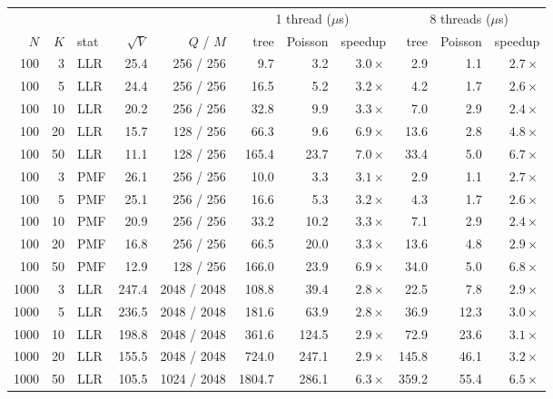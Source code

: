 \documentclass[11pt]{article}
\begin{document}
\begin{table}[tp]
\centering
\small
\begin{tabular}{rrlrrrrrrrr}
\toprule
 & & & & & \multicolumn{3}{c}{1 thread ($\mu$s)} & \multicolumn{3}{c}{8 threads ($\mu$s)} \\
\cmidrule(lr){6-8}\cmidrule(lr){9-11}
$N$ & $K$ & stat & $\sqrt V$ & $Q$ / $M$ & tree & Poisson & speedup & tree & Poisson & speedup \\
\midrule
100  & 3  & LLR & 25.4  & 256 / 256   & 9.7    & 3.2   & $3.0\times$ & 2.9    & 1.1   & $2.7\times$ \\
100  & 5  & LLR & 24.4  & 256 / 256   & 16.5   & 5.2   & $3.2\times$ & 4.2    & 1.7   & $2.6\times$ \\
100  & 10 & LLR & 20.2  & 256 / 256   & 32.8   & 9.9   & $3.3\times$ & 7.0    & 2.9   & $2.4\times$ \\
100  & 20 & LLR & 15.7  & 128 / 256   & 66.3   & 9.6   & $6.9\times$ & 13.6   & 2.8   & $4.8\times$ \\
100  & 50 & LLR & 11.1  & 128 / 256   & 165.4  & 23.7  & $7.0\times$ & 33.4   & 5.0   & $6.7\times$ \\
100  & 3  & PMF & 26.1  & 256 / 256   & 10.0   & 3.3   & $3.1\times$ & 2.9    & 1.1   & $2.7\times$ \\
100  & 5  & PMF & 25.1  & 256 / 256   & 16.6   & 5.3   & $3.2\times$ & 4.3    & 1.7   & $2.6\times$ \\
100  & 10 & PMF & 20.9  & 256 / 256   & 33.2   & 10.2  & $3.3\times$ & 7.1    & 2.9   & $2.4\times$ \\
100  & 20 & PMF & 16.8  & 256 / 256   & 66.5   & 20.0  & $3.3\times$ & 13.6   & 4.8   & $2.9\times$ \\
100  & 50 & PMF & 12.9  & 128 / 256   & 166.0  & 23.9  & $6.9\times$ & 34.0   & 5.0   & $6.8\times$ \\
\midrule
1000 & 3  & LLR & 247.4 & 2048 / 2048 & 108.8  & 39.4  & $2.8\times$ & 22.5   & 7.8   & $2.9\times$ \\
1000 & 5  & LLR & 236.5 & 2048 / 2048 & 181.6  & 63.9  & $2.8\times$ & 36.9   & 12.3  & $3.0\times$ \\
1000 & 10 & LLR & 198.8 & 2048 / 2048 & 361.6  & 124.5 & $2.9\times$ & 72.9   & 23.6  & $3.1\times$ \\
1000 & 20 & LLR & 155.5 & 2048 / 2048 & 724.0  & 247.1 & $2.9\times$ & 145.8  & 46.1  & $3.2\times$ \\
1000 & 50 & LLR & 105.5 & 1024 / 2048 & 1804.7 & 286.1 & $6.3\times$ & 359.2  & 55.4  & $6.5\times$ \\

\end{tabular}
\end{table}
\end{document}
